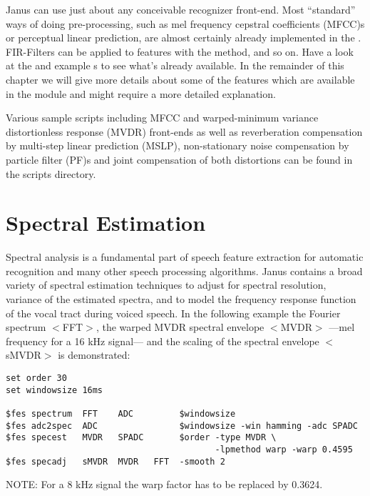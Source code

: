 
Janus  can use just about  any  conceivable recognizer front-end. Most
``standard'' ways of doing pre-processing, such as mel frequency cepstral coefficients (MFCC)s or perceptual linear prediction, are almost certainly already implemented    in the  .  FIR-Filters   can be
applied to features with the   method, and so
on. Have   a  look   at  the     and  example
s to see what's already available. In the remainder of this chapter we will give more details about some of the features which are available in the  module and might require a more detailed explanation.

Various sample scripts including MFCC and warped-minimum variance distortionless response (MVDR) front-ends as well as reverberation compensation by multi-step linear prediction (MSLP), non-stationary noise compensation by particle filter (PF)s and joint compensation of both distortions can be found in the scripts directory.

\section{Spectral Estimation} \label{janus:specest}

Spectral analysis is a fundamental part of speech feature extraction for automatic recognition and many other speech processing algorithms. Janus contains a broad variety of spectral estimation techniques to adjust for spectral resolution, variance of the estimated spectra, and to model the frequency response function of the vocal tract during voiced speech. In the following example the Fourier spectrum $<$FFT$>$, the warped MVDR spectral envelope $<$MVDR$>$ ---mel frequency for a 16 kHz signal--- and the scaling of the spectral envelope $<$sMVDR$>$ is demonstrated:

\begin{verbatim}
set order 30
set windowsize 16ms

$fes spectrum  FFT    ADC         $windowsize
$fes adc2spec  ADC                $windowsize -win hamming -adc SPADC
$fes specest   MVDR   SPADC       $order -type MVDR \
                                         -lpmethod warp -warp 0.4595
$fes specadj   sMVDR  MVDR   FFT  -smooth 2
\end{verbatim}

\noindent
NOTE: For a 8 kHz signal the warp factor has to be replaced by 0.3624.

